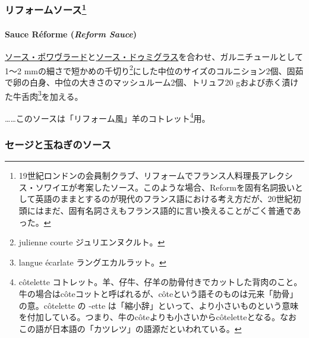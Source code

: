 \begin{recette}
{\subsubsection[リフォームソース]{\texorpdfstring{リフォームソース\footnote{19世紀ロンドンの会員制クラブ、リフォームでフランス人料理長アレクシス・ソワイエが考案したソース。このような場合、Reformを固有名詞扱いとして英語のままとするのが現代のフランス語における考え方だが、20世紀初頭にはまだ、固有名詞さえもフランス語的に言い換えることがごく普通であった。}}{リフォームソース}}\label{ux30eaux30d5ux30a9ux30fcux30e0ux30bdux30fcux30b948}}

\hypertarget{reform-sauce}{%
\paragraph{\texorpdfstring{Sauce Réforme (\emph{Reform
Sauce})}{Sauce Réforme (Reform Sauce)}}\label{reform-sauce}}


\protect\hyperlink{sauce-poivrade}{ソース・ポワヴラード}と\protect\hyperlink{sauce-demi-glace}{ソース・ドゥミグラス}を合わせ、ガルニチュールとして1〜2
mmの細さで短かめの千切り\footnote{julienne courte ジュリエンヌクルト。}にした中位のサイズのコルニション2個、固茹で卵の白身、中位の大きさのマッシュルーム2個、トリュフ20
gおよび赤く漬けた牛舌肉\footnote{langue écarlate ラングエカルラット。}を加える。

\ldots{}\ldots{}このソースは「リフォーム風」羊のコトレット\footnote{côtelette
  コトレット。羊、仔牛、仔羊の肋骨付きでカットした背肉のこと。牛の場合はcôteコットと呼ばれるが、côteという語そのものは元来「肋骨」の意。côtelette
  の -ette
  は「縮小辞」といって、より小さいものという意味を付加している。つまり、牛のcôteよりも小さいからcôteletteとなる。なおこの語が日本語の「カツレツ」の語源だといわれている。}用。

\maeaki

\hypertarget{ux30bbux30fcux30b8ux3068ux7389ux306dux304eux306eux30bdux30fcux30b9}{%
\subsubsection{セージと玉ねぎのソース}\label{ux30bbux30fcux30b8ux3068ux7389ux306dux304eux306eux30bdux30fcux30b9}}


\end{recette}
